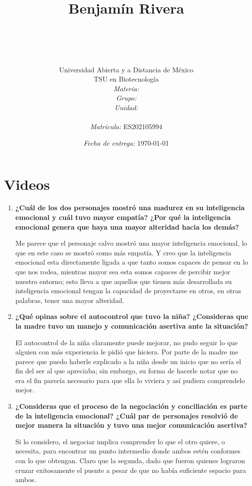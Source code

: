 \documentclass[12pt]{article}
\title{
	\ \\ Benjam\'in Rivera \\
	\bf{\titulo}\\\ \\}
\author{
	{\Huge Universidad Abierta y a Distancia de México}\\
	TSU en Biotecnolog\'ia \\
	\textit{Materia:} \materia \\
	\textit{Grupo:} \grupo \\
	\textit{Unidad:} \unidad \\
	\\
	\textit{Matricula:} ES202105994 }
\date{\textit{Fecha de entrega:} \today}
\begin{document}
\maketitle\newpage

\section{Videos}

\begin{enumerate}
	\item \textbf{ ¿Cuál de los dos personajes mostró una madurez en su inteligencia emocional y cuál tuvo mayor empatía? ¿Por qué la inteligencia emocional genera que haya una mayor alteridad hacia los demás? }
	
	Me parece que el personaje calvo mostró una mayor inteligencia emocional, lo que en este caso se mostró como más empatía. Y creo que la inteligencia emocional esta directamente ligada a que tanto somos capaces de pensar en lo que nos rodea, mientras mayor sea esta somos capaces de percibir mejor nuestro entorno; esto lleva a que aquellos que tienen más desarrollada su inteligencia emocional tengan la capacidad de proyectarse en otros, en otras palabras, tener una mayor alteridad.
	
	\item \textbf{ ¿Qué opinas sobre el autocontrol que tuvo la niña? ¿Consideras que la madre tuvo un manejo y comunicación asertiva ante la situación? }
	
	El autocontrol de la niña claramente puede mejorar, no pudo seguir lo que alguien con más experiencia le pidió que hiciera. Por parte de la madre me parece que puedo haberle explicado a la niña desde un inicio que no sería el fin del ser al que apreciaba; sin embargo, su forma de hacerle notar que no era el fin parecía necesario para que ella lo viviera y así pudiera comprendelo mejor.
	
	\item \textbf{ ¿Consideras que el proceso de la negociación y conciliación es parte de la inteligencia emocional? ¿Cuál par de personajes resolvió de mejor manera la situación y tuvo una mejor comunicación asertiva? }
	
	Si lo considero, el negociar implica comprender lo que el otro quiere, o necesita, para encontrar un punto intermedio donde ambos estén conformes con lo que obtengan. Claro que la segunda, dado que fueron quienes lograron cruzar exitosamente el puente a pesar de que no había suficiente espacio para ambos.
	

\end{enumerate}
\end{document}
